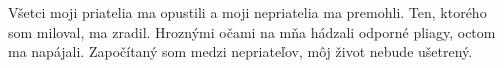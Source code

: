 Všetci moji priatelia ma opustili a moji nepriatelia ma premohli. Ten, ktorého som miloval, ma zradil.
\versseparator
Hroznými očami na mňa hádzali odporné pliagy, octom ma napájali.
\versseparator
Započítaný som medzi nepriateľov, môj život nebude ušetrený.
